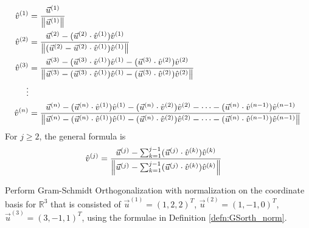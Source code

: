 \begin{defn}
\label{defn:GSorth_norm}
\begin{align}
\hat{v}^{(1)} &= \frac{\vec{u}^{(1)}}{\norm{\vec{u}^{(1)}}} \nonumber \\
\hat{v}^{(2)} &= \frac{\vec{u}^{(2)} - (\vec{u}^{(2)} \cdot \hat{v}^{(1)})\hat{v}^{(1)}}{\norm{(\vec{u}^{(2)} - \vec{u}^{(2)} \cdot \hat{v}^{(1)})\hat{v}^{(1)}}} \nonumber \\
\hat{v}^{(3)} &= \frac{\vec{u}^{(3)} - (\vec{u}^{(3)} \cdot \hat{v}^{(1)})\hat{v}^{(1)} - (\vec{u}^{(3)} \cdot \hat{v}^{(2)})\hat{v}^{(2)}}{\norm{\vec{u}^{(3)} - (\vec{u}^{(3)} \cdot \hat{v}^{(1)})\hat{v}^{(1)} - (\vec{u}^{(3)} \cdot \hat{v}^{(2)})\hat{v}^{(2)}}} \\
\vdots \nonumber \\
\hat{v}^{(n)} &= \frac{\vec{u}^{(n)} - (\vec{u}^{(n)} \cdot \hat{v}^{(1)})\hat{v}^{(1)} - (\vec{u}^{(n)} \cdot \hat{v}^{(2)})\hat{v}^{(2)} - \cdots - (\vec{u}^{(n)} \cdot \hat{v}^{(n-1)})\hat{v}^{(n-1)}}{\norm{\vec{u}^{(n)} - (\vec{u}^{(n)} \cdot \hat{v}^{(1)})\hat{v}^{(1)} - (\vec{u}^{(n)} \cdot \hat{v}^{(2)})\hat{v}^{(2)} - \cdots - (\vec{u}^{(n)} \cdot \hat{v}^{(n-1)})\hat{v}^{(n-1)}}} \nonumber
\end{align}
For $j \geq 2$, the general formula is
\begin{align}
\hat{v}^{(j)} &= \frac{\vec{u}^{(j)} - \sum_{k=1}^{j-1}(\vec{u}^{(j)} \cdot \hat{v}^{(k)})\hat{v}^{(k)}}{\norm{\vec{u}^{(j)} - \sum_{k=1}^{j-1}(\vec{u}^{(j)} \cdot \hat{v}^{(k)})\hat{v}^{(k)}}} \label{eqn:GSorth_norm}
\end{align}
\end{defn}
\begin{exmp}
\label{exmp:GS_ex}
Perform Gram-Schmidt Orthogonalization with normalization on the coordinate basis for $\mathbb{R}^3$ that is consisted of $\vec{u}^{(1)} = (1,2,2)^T$, $\vec{u}^{(2)} = (1,-1,0)^T$, $\vec{u}^{(3)} = (3,-1,1)^T$, using the formulae in Definition \ref{defn:GSorth_norm}.
\end{exmp}
